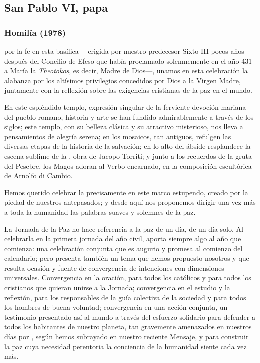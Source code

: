 \homiliasABC

\subsection{San Pablo VI, papa}

\subsubsection{Homilía (1978)}

\begin{body}
	 por la fe en esta basílica ---erigida por nuestro predecesor Sixto III pocos años después del Concilio de Efeso que había proclamado solemnemente en el año 431 a María la \emph{Theotokos}, es decir, Madre de Dios---, unamos en esta celebración la alabanza por los altísimos privilegios concedidos por Dios a la Virgen Madre, juntamente con la reflexión sobre las exigencias cristianas de la paz en el mundo.
	
	En este espléndido templo, expresión singular de la ferviente devoción mariana del pueblo romano, historia y arte se han fundido admirablemente a través de los siglos; este templo, con su belleza clásica y su atractivo misterioso, nos lleva a pensamientos de alegría serena; en los mosaicos, tan antiguos, refulgen las diversas etapas de la historia de la salvación; en lo alto del ábside resplandece la escena sublime de la , obra de Jacopo Torriti; y junto a los recuerdos de la gruta del Pesebre, los Magos adoran al Verbo encarnado, en la composición escultórica de Arnolfo di Cambio.
	
	Hemos querido celebrar la  precisamente en este marco estupendo, creado por la piedad de nuestros antepasados; y desde aquí nos proponemos dirigir una vez más a toda la humanidad las palabras suaves y solemnes de la paz.
	
	La Jornada de la Paz no hace referencia a la paz de un día, de un día solo. Al celebrarla en la primera jornada del año civil, aporta siempre algo al año que comienza: una celebración conjunta que es augurio y promesa al comienzo del calendario; pero presenta también un tema que hemos propuesto nosotros y que resulta ocasión y fuente de convergencia de intenciones con dimensiones universales. Convergencia en la oración, para todos los católicos y para todos los cristianos que quieran unirse a la Jornada; convergencia en el estudio y la reflexión, para los responsables de la guía colectiva de la sociedad y para todos los hombres de buena voluntad; convergencia en una acción conjunta, un testimonio presentado así al mundo a través del esfuerzo solidario para defender a todos los habitantes de nuestro planeta, tan gravemente amenazados en nuestros días por , según hemos subrayado en nuestro reciente Mensaje, y para construir la paz cuya necesidad perentoria la conciencia de la humanidad siente cada vez más.
	

\end{body}
